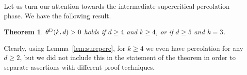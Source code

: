 \documentclass[oneside]{amsart}
\newcommand{\N}{\mathbb{N}}
\newtheorem{theorem}{Theorem}[section]
\theoremstyle{definition}
\renewcommand{\P}{\mathbb{P}}
\newcommand{\1}{\mathbbm{1}}
\newcommand{\0}{\mathbf{o}}
\newcommand{\Z}{\mathbb{Z}}
\numberwithin{equation}{section}
\begin{document}
Let us turn our attention towards the intermediate supercritical percolation phase. 
We have the following result.
\begin{theorem}\label{thm-CoxDurrett}
$\theta^{\rm D}(k,d)>0$ holds if $d \geq 4$ and $k \geq 4$, or if $d \geq 5$ and $k=3$. 
\end{theorem}
Clearly, using Lemma~\ref{lem:sureperc}, for $k \geq 4$ we even have percolation for any $d \geq 2$, but we did not include this in the statement of the theorem in order to separate assertions with different proof techniques.
\end{document}
